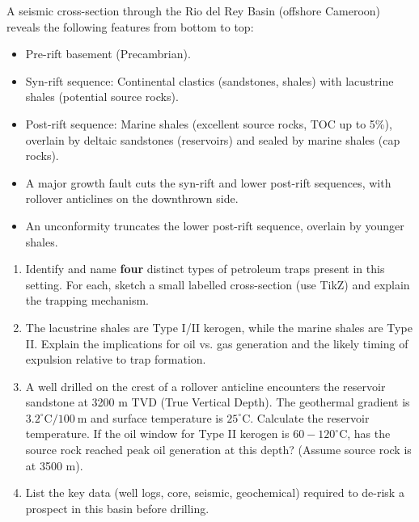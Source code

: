 \documentclass[11pt]{article}
\newcommand{\cle}[1]{{\popxbold\color{popdark}#1}}
\begin{document}
\begin{exercice}
A seismic cross-section through the \cle{Rio del Rey Basin} (offshore Cameroon) reveals the following features from bottom to top:
\begin{itemize}
\item Pre-rift basement (Precambrian).
\item Syn-rift sequence: Continental clastics (sandstones, shales) with lacustrine shales (potential source rocks).
\item Post-rift sequence: Marine shales (excellent source rocks, TOC up to 5\%), overlain by deltaic sandstones (reservoirs) and sealed by marine shales (cap rocks).
\item A major growth fault cuts the syn-rift and lower post-rift sequences, with rollover anticlines on the downthrown side.
\item An unconformity truncates the lower post-rift sequence, overlain by younger shales.
\end{itemize}

\begin{enumerate}
\item Identify and name \textbf{four} distinct types of petroleum traps present in this setting. For each, sketch a small labelled cross-section (use TikZ) and explain the trapping mechanism.
\item The lacustrine shales are Type I/II kerogen, while the marine shales are Type II. Explain the implications for oil vs. gas generation and the likely timing of expulsion relative to trap formation.
\item A well drilled on the crest of a rollover anticline encounters the reservoir sandstone at 3200 m TVD (True Vertical Depth). The geothermal gradient is $3.2^\circ\mathrm{C}/100\ \mathrm{m}$ and surface temperature is $25^\circ\mathrm{C}$. Calculate the reservoir temperature. If the oil window for Type II kerogen is $60-120^\circ\mathrm{C}$, has the source rock reached peak oil generation at this depth? (Assume source rock is at 3500 m).
\item List the key data (well logs, core, seismic, geochemical) required to de-risk a prospect in this basin before drilling.
\end{enumerate}
\end{exercice}
\end{document}

